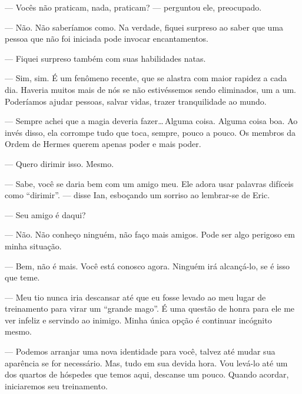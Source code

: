 --- Vocês não praticam, nada, praticam? --- perguntou ele, preocupado.

--- Não. Não saberíamos como. Na verdade, fiquei surpreso ao saber que uma
pessoa que não foi iniciada pode invocar encantamentos.

--- Fiquei surpreso também com suas habilidades natas.

--- Sim, sim. É um fenômeno recente, que se alastra com maior rapidez a cada
dia. Haveria muitos mais de nós se não estivéssemos sendo eliminados, um a um.
Poderíamos ajudar pessoas, salvar vidas, trazer tranquilidade ao mundo.

--- Sempre achei que a magia deveria fazer\ldots\,Alguma coisa. Alguma coisa
boa. Ao invés disso, ela corrompe tudo que toca, sempre, pouco a pouco. Os
membros da Ordem de Hermes querem apenas poder e mais poder.

--- Quero dirimir isso. Mesmo.

--- Sabe, você se daria bem com um amigo meu. Ele adora usar palavras difíceis
como “dirimir”. --- disse Ian, esboçando um sorriso ao lembrar-se de Eric.

--- Seu amigo é daqui?

--- Não. Não conheço ninguém, não faço mais amigos. Pode ser algo perigoso em
minha situação.

--- Bem, não é mais. Você está conosco agora. Ninguém irá alcançá-lo, se é isso
que teme.

--- Meu tio nunca iria descansar até que eu fosse levado ao meu lugar de
treinamento para virar um “grande mago”. É uma questão de honra para ele me ver
infeliz e servindo ao inimigo. Minha única opção é continuar incógnito mesmo.

--- Podemos arranjar uma nova identidade para você, talvez até mudar sua
aparência se for necessário. Mas, tudo em sua devida hora. Vou levá-lo até um
dos quartos de hóspedes que temos aqui, descanse um pouco. Quando acordar,
iniciaremos seu treinamento.
